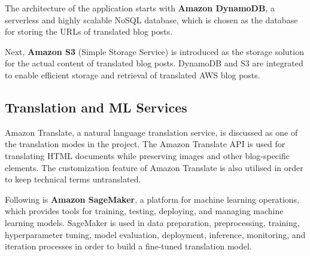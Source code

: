 The architecture of the application starts with \textbf{Amazon DynamoDB}, a serverless and highly scalable NoSQL database, which is chosen as the database for storing the URLs of translated blog posts.

Next, \textbf{Amazon S3} (Simple Storage Service) is introduced as the storage solution for the actual content of translated blog posts. DynamoDB and S3 are integrated to enable efficient storage and retrieval of translated AWS blog posts.

\subsection{Translation and ML Services}
Amazon Translate, a natural language translation service, is discussed as one of the translation modes in the project. The Amazon Translate API is used for translating HTML documents while preserving images and other blog-specific elements. The customization feature of Amazon Translate is also utilised in order to keep technical terms untranslated.

Following is \textbf{Amazon SageMaker}, a platform for machine learning operations, which provides tools for training, testing, deploying, and managing machine learning models. SageMaker is used in data preparation, preprocessing, training, hyperparameter tuning, model evaluation, deployment, inference, monitoring, and iteration processes in order to build a fine-tuned translation model.
